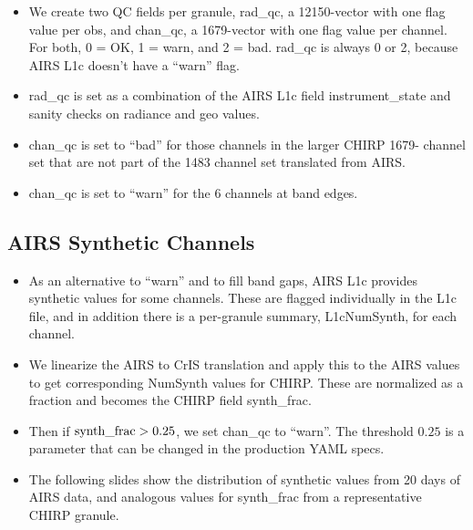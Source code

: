 \documentclass[12pt]{article}
\begin{document}
\begin{itemize}

  \item We create two QC fields per granule, rad\_qc, a 12150-vector
    with one flag value per obs, and chan\_qc, a 1679-vector with one
    flag value per channel.  For both, 0 = OK, 1 = warn, and 2 = bad.
    rad\_qc is always 0 or 2, because AIRS L1c doesn't have a ``warn''
    flag.

  \item rad\_qc is set as a combination of the AIRS L1c field
    instrument\_state and sanity checks on radiance and geo values.

  \item chan\_qc is set to ``bad'' for those channels in the larger
    CHIRP 1679- channel set that are not part of the 1483 channel
    set translated from AIRS.

  \item chan\_qc is set to ``warn'' for the 6 channels at band edges.

\end{itemize}

\subsection{AIRS Synthetic Channels}

\begin{itemize}

  \item As an alternative to ``warn'' and to fill band gaps, AIRS
    L1c provides synthetic values for some channels.  These are
    flagged individually in the L1c file, and in addition there is a
    per-granule summary, L1cNumSynth, for each channel.

  \item We linearize the AIRS to CrIS translation and apply
    this to the AIRS values to get corresponding NumSynth values
    for CHIRP.  These are normalized as a fraction and becomes
    the CHIRP field synth\_frac.

  \item Then if $\hbox{synth\_frac} > 0.25$, we set chan\_qc to
    ``warn''.  The threshold $0.25$ is a parameter that can be changed
    in the production YAML specs.

  \item The following slides show the distribution of synthetic
    values from 20 days of AIRS data, and analogous values for
    synth\_frac from a representative CHIRP granule.

\end{itemize}
\end{document}
